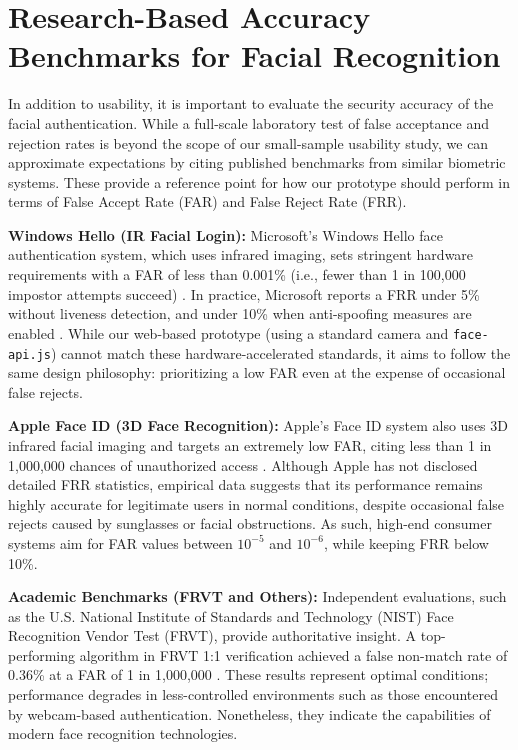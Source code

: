 \section{Research-Based Accuracy Benchmarks for Facial Recognition}

In addition to usability, it is important to evaluate the security accuracy of the facial authentication. While a full-scale laboratory test of false acceptance and rejection rates is beyond the scope of our small-sample usability study, we can approximate expectations by citing published benchmarks from similar biometric systems. These provide a reference point for how our prototype should perform in terms of False Accept Rate (FAR) and False Reject Rate (FRR).

\textbf{Windows Hello (IR Facial Login):} Microsoft’s Windows Hello face authentication system, which uses infrared imaging, sets stringent hardware requirements with a FAR of less than 0.001\% (i.e., fewer than 1 in 100{,}000 impostor attempts succeed) \autocite{MicrosoftHelloDocs}. In practice, Microsoft reports a FRR under 5\% without liveness detection, and under 10\% when anti-spoofing measures are enabled \autocite{MicrosoftHelloDocs}. While our web-based prototype (using a standard camera and \texttt{face-api.js}) cannot match these hardware-accelerated standards, it aims to follow the same design philosophy: prioritizing a low FAR even at the expense of occasional false rejects.

\textbf{Apple Face ID (3D Face Recognition):} Apple’s Face ID system also uses 3D infrared facial imaging and targets an extremely low FAR, citing less than 1 in 1{,}000{,}000 chances of unauthorized access \autocite{BentoFaceID}. Although Apple has not disclosed detailed FRR statistics, empirical data suggests that its performance remains highly accurate for legitimate users in normal conditions, despite occasional false rejects caused by sunglasses or facial obstructions. As such, high-end consumer systems aim for FAR values between $10^{-5}$ and $10^{-6}$, while keeping FRR below 10\%.

\textbf{Academic Benchmarks (FRVT and Others):} Independent evaluations, such as the U.S. National Institute of Standards and Technology (NIST) Face Recognition Vendor Test (FRVT), provide authoritative insight. A top-performing algorithm in FRVT 1:1 verification achieved a false non-match rate of 0.36\% at a FAR of 1 in 1{,}000{,}000 \autocite{ParavisionFRVT}. These results represent optimal conditions; performance degrades in less-controlled environments such as those encountered by webcam-based authentication. Nonetheless, they indicate the capabilities of modern face recognition technologies.

